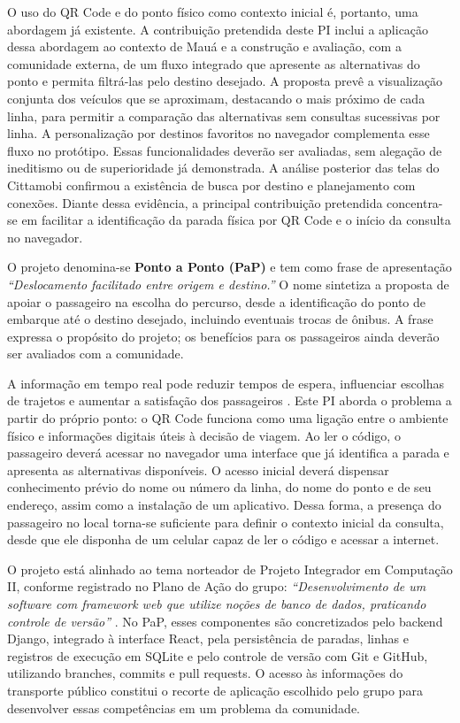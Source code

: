 \documentclass[12pt,oneside,a4paper,brazil]{abntex2}
\begin{document}
O uso do QR Code e do ponto físico como contexto inicial é, portanto, uma abordagem já existente. A contribuição pretendida deste PI inclui a aplicação dessa abordagem ao contexto de Mauá e a construção e avaliação, com a comunidade externa, de um fluxo integrado que apresente as alternativas do ponto e permita filtrá-las pelo destino desejado. A proposta prevê a visualização conjunta dos veículos que se aproximam, destacando o mais próximo de cada linha, para permitir a comparação das alternativas sem consultas sucessivas por linha. A personalização por destinos favoritos no navegador complementa esse fluxo no protótipo. Essas funcionalidades deverão ser avaliadas, sem alegação de ineditismo ou de superioridade já demonstrada. A análise posterior das telas do Cittamobi confirmou a existência de busca por destino e planejamento com conexões. Diante dessa evidência, a principal contribuição pretendida concentra-se em facilitar a identificação da parada física por QR Code e o início da consulta no navegador.

O projeto denomina-se \textbf{Ponto a Ponto (PaP)} e tem como frase de apresentação \textit{``Deslocamento facilitado entre origem e destino.''} O nome sintetiza a proposta de apoiar o passageiro na escolha do percurso, desde a identificação do ponto de embarque até o destino desejado, incluindo eventuais trocas de ônibus. A frase expressa o propósito do projeto; os benefícios para os passageiros ainda deverão ser avaliados com a comunidade.

A informação em tempo real pode reduzir tempos de espera, influenciar escolhas de trajetos e aumentar a satisfação dos passageiros \citep{brakewood2019}. Este PI aborda o problema a partir do próprio ponto: o QR Code funciona como uma ligação entre o ambiente físico e informações digitais úteis à decisão de viagem. Ao ler o código, o passageiro deverá acessar no navegador uma interface que já identifica a parada e apresenta as alternativas disponíveis. O acesso inicial deverá dispensar conhecimento prévio do nome ou número da linha, do nome do ponto e de seu endereço, assim como a instalação de um aplicativo. Dessa forma, a presença do passageiro no local torna-se suficiente para definir o contexto inicial da consulta, desde que ele disponha de um celular capaz de ler o código e acessar a internet.

O projeto está alinhado ao tema norteador de Projeto Integrador em Computação II, conforme registrado no Plano de Ação do grupo: \textit{``Desenvolvimento de um software com framework web que utilize noções de banco de dados, praticando controle de versão''} \citep[p.~1]{planoacao2026}. No PaP, esses componentes são concretizados pelo backend Django, integrado à interface React, pela persistência de paradas, linhas e registros de execução em SQLite e pelo controle de versão com Git e GitHub, utilizando branches, commits e pull requests. O acesso às informações do transporte público constitui o recorte de aplicação escolhido pelo grupo para desenvolver essas competências em um problema da comunidade.
\end{document}
